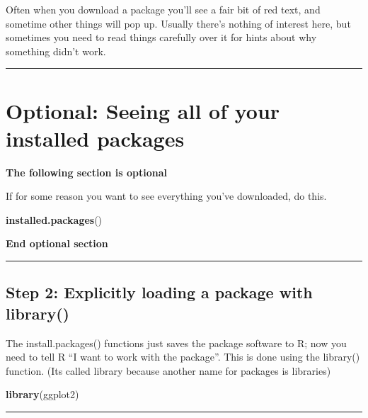 \documentclass[]{book}
\newenvironment{Shaded}{\begin{snugshade}}{\end{snugshade}}
\newcommand{\KeywordTok}[1]{\textcolor[rgb]{0.13,0.29,0.53}{\textbf{#1}}}
\newcommand{\NormalTok}[1]{#1}
\theoremstyle{definition}
\theoremstyle{definition}
\theoremstyle{definition}
\theoremstyle{remark}
\begin{document}
Often when you download a package you'll see a fair bit of red text, and
sometime other things will pop up. Usually there's nothing of interest
here, but sometimes you need to read things carefully over it for hints
about why something didn't work.

\begin{center}\rule{0.5\linewidth}{\linethickness}\end{center}

\section{Optional: Seeing all of your installed
packages}\label{optional-seeing-all-of-your-installed-packages}

\textbf{The following section is optional}

If for some reason you want to see everything you've downloaded, do
this.

\begin{Shaded}
\begin{Highlighting}[]
\KeywordTok{installed.packages}\NormalTok{()}
\end{Highlighting}
\end{Shaded}

\textbf{End optional section}

\begin{center}\rule{0.5\linewidth}{\linethickness}\end{center}

\subsection{\texorpdfstring{\protect\hyperlink{section-3}{} Step 2:
Explicitly loading a package with
library()}{ Step 2: Explicitly loading a package with library()}}\label{step-2-explicitly-loading-a-package-with-library}

The install.packages() functions just saves the package software to R;
now you need to tell R ``I want to work with the package''. This is done
using the library() function. (Its called library because another name
for packages is libraries)

\begin{Shaded}
\begin{Highlighting}[]
\KeywordTok{library}\NormalTok{(ggplot2)}
\end{Highlighting}
\end{Shaded}

\begin{center}\rule{0.5\linewidth}{\linethickness}\end{center}
\end{document}
